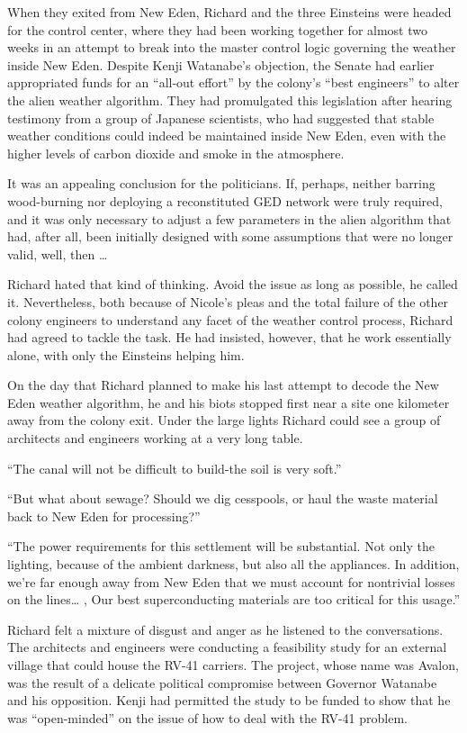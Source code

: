 \documentclass[]{article}
\begin{document}
{When they exited from New Eden, Richard and the three Einsteins were headed for the control center, where they had been working together for almost two weeks in an attempt to break into the master control logic governing the weather inside New Eden.  Despite Kenji Watanabe’s objection, the Senate had earlier appropriated funds for an “all-out effort” by the colony’s “best engineers” to alter the alien weather algorithm.  They had promulgated this legislation after hearing testimony from a group of Japanese scientists, who had suggested that stable weather conditions could indeed be maintained inside New Eden, even with the higher levels of carbon dioxide and smoke in the atmosphere.

It was an appealing conclusion for the politicians.  If, perhaps, neither barring wood-burning nor deploying a reconstituted GED network were truly required, and it was only necessary to adjust a few parameters in the alien algorithm that had, after all, been initially designed with some assumptions that were no longer valid, well, then …

Richard hated that kind of thinking.  Avoid the issue as long as possible, he called it.  Nevertheless, both because of Nicole’s pleas and the total failure of the other colony engineers to understand any facet of the weather control process, Richard had agreed to tackle the task.  He had insisted, however, that he work essentially alone, with only the Einsteins helping him.

On the day that Richard planned to make his last attempt to decode the New Eden weather algorithm, he and his biots stopped first near a site one kilometer away from the colony exit.  Under the large lights Richard could see a group of architects and engineers working at a very long table.

“The canal will not be difficult to build-the soil is very soft.”

“But what about sewage? Should we dig cesspools, or haul the waste material back to New Eden for processing?”

“The power requirements for this settlement will be substantial.  Not only the lighting, because of the ambient darkness, but also all the appliances.  In addition, we’re far enough away from New Eden that we must account for nontrivial losses on the lines… , Our best superconducting materials are too critical for this usage.”

Richard felt a mixture of disgust and anger as he listened to the conversations.  The architects and engineers were conducting a feasibility study for an external village that could house the RV-41 carriers.  The project, whose name was Avalon, was the result of a delicate political compromise between Governor Watanabe and his opposition.  Kenji had permitted the study to be funded to show that he was “open-minded” on the issue of how to deal with the RV-41 problem.

}
\end{document}
